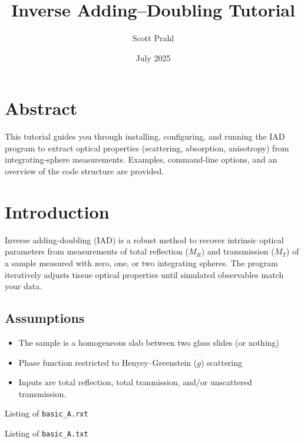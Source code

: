 \documentclass[11pt,oneside]{book}
\title{Inverse Adding–Doubling Tutorial}
\author{Scott Prahl}
\date{July 2025}
\begin{document}
\frontmatter
\maketitle

\chapter*{Abstract}

This tutorial guides you through installing, configuring, and running the IAD program
to extract optical properties (scattering, absorption, anisotropy) from integrating‐sphere
measurements. Examples, command‐line options, and an overview of the code structure
are provided.


\tableofcontents

\mainmatter

\chapter{Introduction}
Inverse adding-doubling (IAD) is a robust method to recover intrinsic optical parameters
from measurements of total reflection ($M_R$) and transmission ($M_T$) of a sample
measured with zero, one, or two integrating spheres. The program iteratively adjusts tissue optical properties
until simulated observables match your data.
\section{Assumptions}
\begin{itemize}
  \item The sample is a homogeneous slab between two glass slides (or nothing)
  \item Phase function restricted to Henyey–Greenstein ($g$) scattering
  \item Inputs are total reflection, total tranmission, and/or unscattered transmission.
\end{itemize}




%
%

\cleardoublepage
\appendix
{}
Listing of \texttt{basic_A.rxt}


\cleardoublepage
\appendix
{}
Listing of \texttt{basic_A.txt}

\end{document}
